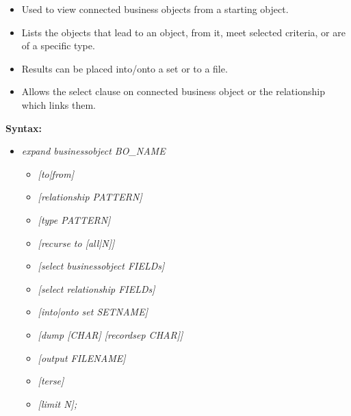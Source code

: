 \documentclass[11pt,twoside,a4paper]{article}
\begin{document}
\begin{itemize}
	\item Used to view connected business objects from a starting object.
	\item Lists the objects that lead to an object, from it, meet selected criteria, or are of a specific type.
	\item Results can be placed into/onto a set or to a file.
	\item Allows the select clause on connected business object or the relationship which links them.
\end{itemize}

\textbf{\textbf{Syntax:}}
\begin{itemize}
	\item[] \emph{expand businessobject BO\_NAME}
	\begin{itemize}
		\item[] \emph{[to|from]}
		\item[] \emph{[relationship PATTERN]}
		\item[] \emph{[type PATTERN]}
		\item[] \emph{[recurse to [all|N]]}
		\item[] \emph{[select businessobject FIELDs]}
		\item[] \emph{[select relationship FIELDs]}
		\item[] \emph{[into|onto set SETNAME]}
		\item[] \emph{[dump [CHAR] [recordsep CHAR]]}
		\item[] \emph{[output FILENAME]}
		\item[] \emph{[terse]}
		\item[] \emph{[limit N];}
	\end{itemize}
\end{itemize}~\\
 
\end{document}
